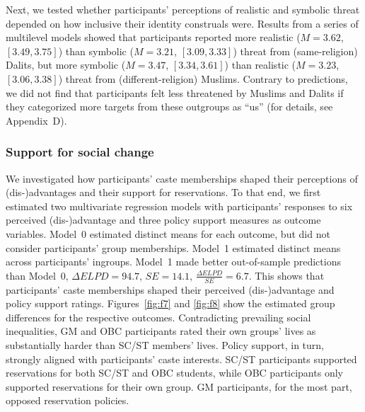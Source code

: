 \documentclass[12pt, a4paper]{article}
\begin{document}
Next, we tested whether participants' perceptions of realistic and symbolic threat depended on how inclusive their identity construals were. Results from a series of multilevel models showed that participants reported more realistic ($M = 3.62$, $[3.49, 3.75]$) than symbolic ($M = 3.21$, $[3.09, 3.33]$) threat from (same-religion) Dalits, but more symbolic ($M = 3.47$, $[3.34, 3.61]$) than realistic ($M = 3.23$, $[3.06, 3.38]$) threat from (different-religion) Muslims. Contrary to predictions, we did not find that participants felt less threatened by Muslims and Dalits if they categorized more targets from these outgroups as ``us'' (for details, see Appendix~D).

\subsubsection{Support for social change}

We investigated how participants' caste memberships shaped their perceptions of (dis-)advantages and their support for reservations. To that end, we first estimated two multivariate regression models with participants' responses to six perceived (dis-)advantage and three policy support measures as outcome variables. Model~0 estimated distinct means for each outcome, but did not consider participants' group memberships. Model~1 estimated distinct means across participants' ingroups. Model~1 made better out-of-sample predictions than Model~0, $\Delta\textit{ELPD} = 94.7$, $\textit{SE} = 14.1$, $\frac{\Delta\textit{ELPD}}{\textit{SE}} = 6.7$. This shows that participants' caste memberships shaped their perceived (dis-)advantage and policy support ratings. Figures~\ref{fig:f7} and \ref{fig:f8} show the estimated group differences for the respective outcomes. Contradicting prevailing social inequalities, GM and OBC participants rated their own groups' lives as substantially harder than SC/ST members' lives. Policy support, in turn, strongly aligned with participants' caste interests. SC/ST participants supported reservations for both SC/ST and OBC students, while OBC participants only supported reservations for their own group. GM participants, for the most part, opposed reservation policies.
\end{document}

